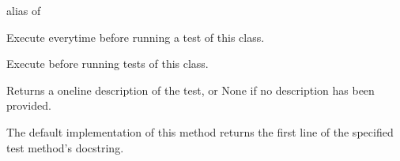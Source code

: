 \documentclass[letterpaper,10pt,english]{sphinxmanual}
\begin{document}
\begin{fulllineitems}
\begin{fulllineitems}
\label{\detokenize{_autosummary/tests.test_unit.test_sqlite:tests.test_unit.test_sqlite.failureException}}
\pysigstartsignatures
{}
\pysigstopsignatures
\sphinxAtStartPar
alias of 

\end{fulllineitems}


\begin{fulllineitems}
\label{\detokenize{_autosummary/tests.test_unit.test_sqlite:tests.test_unit.test_sqlite.setUp}}
\pysigstartsignatures
{}
\pysigstopsignatures
\sphinxAtStartPar
Execute everytime before running a test of this class.

\end{fulllineitems}


\begin{fulllineitems}
\label{\detokenize{_autosummary/tests.test_unit.test_sqlite:tests.test_unit.test_sqlite.setUpClass}}
\pysigstartsignatures
{}
\pysigstopsignatures
\sphinxAtStartPar
Execute before running tests of this class.

\end{fulllineitems}


\begin{fulllineitems}
\label{\detokenize{_autosummary/tests.test_unit.test_sqlite:tests.test_unit.test_sqlite.shortDescription}}
\pysigstartsignatures
{}
\pysigstopsignatures
\sphinxAtStartPar
Returns a one\sphinxhyphen{}line description of the test, or None if no
description has been provided.

\sphinxAtStartPar
The default implementation of this method returns the first line of
the specified test method’s docstring.


\end{fulllineitems}
\end{fulllineitems}
\end{document}

